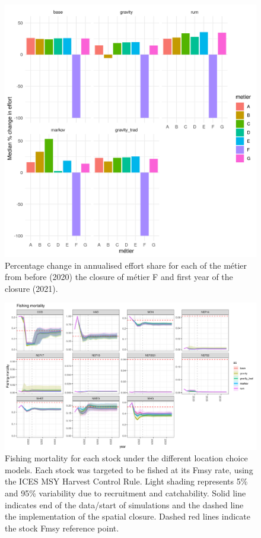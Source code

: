 \documentclass[12pt, halfline, a4paper]{ouparticle}
\begin{document}
\begin{figure}[!ht]
	\centering
	\includegraphics[width=1\linewidth]{figures/Change_effort}
	\caption{Percentage change in annualised effort share for each of the
		métier from before (2020) the closure of métier F and first
		year of the closure (2021).} 
	\label{fig:effort_chg}
\end{figure}	



\begin{figure}[!ht]
	\centering
	\includegraphics[width=1\linewidth]{figures/F_difference}
	\caption{Fishing mortality for each stock under the different location
		choice models. Each stock was targeted to be fished at its Fmsy
		rate, using the ICES MSY Harvest Control Rule. Light shading
		represents 5\% and 95\% variability due to recruitment and
		catchability. Solid line indicates end of the data/start of
		simulations and the dashed line the implementation of the
		spatial closure. Dashed red lines indicate the stock Fmsy
		reference point.} 
	\label{fig:F}
\end{figure}	
\end{document}
